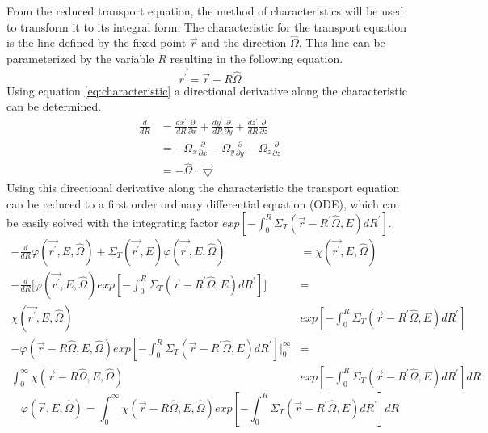From the reduced transport equation, the method of characteristics will be 
used to transform it to its integral form. The characteristic for the transport 
equation is the line defined by the fixed point $\vec{r}$ and the direction 
$\hat{\Omega}$. This line can be parameterized by the variable $R$ resulting in 
the following equation. 
\begin{equation}
  \vec{r^{'}} = \vec{r} - R\hat{\Omega}
  \label{eq:characteristic}
\end{equation}
Using equation \ref{eq:characteristic} a directional derivative along the
characteristic can be determined.
\begin{align}
  \frac{d}{dR} & = \frac{dx^{'}}{dR}\frac{\partial}{\partial x} +
  \frac{dy^{'}}{dR}\frac{\partial}{\partial y} +
  \frac{dz^{'}}{dR}\frac{\partial}{\partial z} \nonumber \\
  & = -\Omega_x \frac{\partial}{\partial x} -
  \Omega_y \frac{\partial}{\partial y} -
  \Omega_z \frac{\partial}{\partial z} \nonumber \\
  & = -\hat{\Omega} \cdot \vec{\bigtriangledown}
\end{align}
Using this directional derivative along the characteristic the transport 
equation can be reduced to a first order ordinary differential equation (ODE), 
which can be easily solved with the integrating factor
$exp\left[-\int_0^R \Sigma_T(\vec{r}-R^{'}\hat{\Omega},E)dR^{'} \right]$.
\begin{align}
  -\frac{d}{dR}\varphi(\vec{r^{'}},E,\hat{\Omega}) + \Sigma_T(\vec{r^{'}},E)
  \varphi(\vec{r^{'}},E,\hat{\Omega}) & =
  \chi(\vec{r^{'}},E,\hat{\Omega}) \nonumber \\
  -\frac{d}{dR}\bigg[\varphi(\vec{r^{'}},E,\hat{\Omega})
      exp\left[-\int_0^R \Sigma_T(\vec{r}-R^{'}\hat{\Omega},E)dR^{'}\right]
      \bigg] & = \nonumber \\
  \chi(\vec{r^{'}},E,\hat{\Omega})
  &exp\left[-\int_0^R \Sigma_T(\vec{r}-R^{'}\hat{\Omega},E)dR^{'} \right]
    \nonumber \\
    -\varphi(\vec{r} - R\hat{\Omega},E,\hat{\Omega})
    exp\left[-\int_0^R \Sigma_T(\vec{r}-R^{'}\hat{\Omega},E)dR^{'}\right] 
    \bigg|_0^{\infty} & = \nonumber \\
    \int_0^{\infty} 
    \chi(\vec{r} - R\hat{\Omega},E,\hat{\Omega})
    &exp\left[-\int_0^R \Sigma_T(\vec{r}-R^{'}\hat{\Omega},E)dR^{'} \right] dR
    \nonumber 
\end{align}
\begin{equation}
    \varphi(\vec{r},E,\hat{\Omega}) = 
    \int_0^{\infty} \chi(\vec{r} - R\hat{\Omega},E,\hat{\Omega})
    exp\left[-\int_0^R \Sigma_T(\vec{r}-R^{'}\hat{\Omega},E)dR^{'} \right] dR
  \label{eq:line_integral_transport_eqn}
\end{equation}
